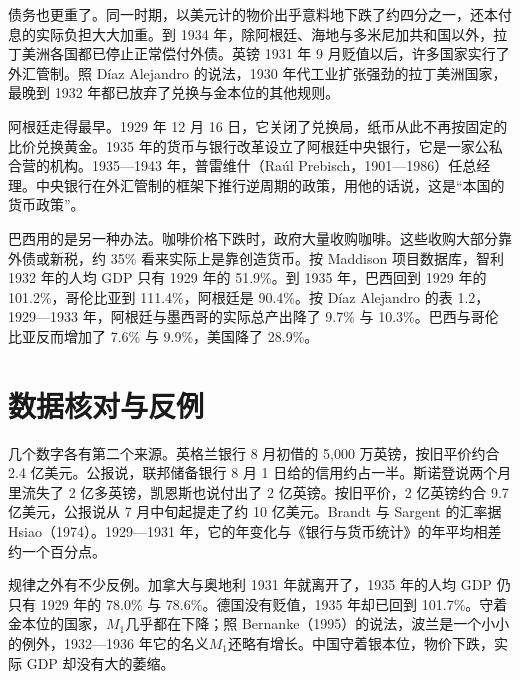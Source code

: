 债务也更重了。同一时期，以美元计的物价出乎意料地下跌了约四分之一，还本付息的实际负担大大加重\cite{diaz1983}。到 1934 年，除阿根廷、海地与多米尼加共和国以外，拉丁美洲各国都已停止正常偿付外债\cite{diaz1983}。英镑 1931 年 9 月贬值以后，许多国家实行了外汇管制\cite{diaz1983}。照 Díaz Alejandro 的说法，1930 年代工业扩张强劲的拉丁美洲国家，最晚到 1932 年都已放弃了兑换与金本位的其他规则\cite{diaz1983}。

阿根廷走得最早。1929 年 12 月 16 日，它关闭了兑换局，纸币从此不再按固定的比价兑换黄金\cite{frb1931}。1935 年的货币与银行改革设立了阿根廷中央银行，它是一家公私合营的机构\cite{bcra2025}。1935—1943 年，普雷维什（Raúl Prebisch，1901—1986）任总经理\cite{bcra2025,bnf29}。中央银行在外汇管制的框架下推行逆周期的政策，用他的话说，这是“本国的货币政策”\cite{bcra2025}。

巴西用的是另一种办法。咖啡价格下跌时，政府大量收购咖啡。这些收购大部分靠外债或新税，约 35\% 看来实际上是靠创造货币\cite{diaz1983}。按 Maddison 项目数据库，智利 1932 年的人均 GDP 只有 1929 年的 51.9\%\cite{mpd2023}。到 1935 年，巴西回到 1929 年的 101.2\%，哥伦比亚到 111.4\%，阿根廷是 90.4\%\cite{mpd2023}。按 Díaz Alejandro 的表 1.2，1929—1933 年，阿根廷与墨西哥的实际总产出降了 9.7\% 与 10.3\%\cite{diaz1983}。巴西与哥伦比亚反而增加了 7.6\% 与 9.9\%，美国降了 28.9\%\cite{diaz1983}。

\section{数据核对与反例}\label{sec:depressionworld-check}

几个数字各有第二个来源。英格兰银行 8 月初借的 5,000 万英镑，按旧平价约合 2.4 亿美元\cite{hansard1931}。公报说，联邦储备银行 8 月 1 日给的信用约占一半\cite{frb1931}。斯诺登说两个月里流失了 2 亿多英镑，凯恩斯也说付出了 2 亿英镑\cite{hansard1931,keynes1931}。按旧平价，2 亿英镑约合 9.7 亿美元，公报说从 7 月中旬起提走了约 10 亿美元\cite{frb1931}。Brandt 与 Sargent 的汇率据 Hsiao（1974）\cite{brandt1989}。1929—1931 年，它的年变化与《银行与货币统计》的年平均相差约一个百分点\cite{bms1943}。

规律之外有不少反例。加拿大与奥地利 1931 年就离开了，1935 年的人均 GDP 仍只有 1929 年的 78.0\% 与 78.6\%\cite{mpd2023}。德国没有贬值，1935 年却已回到 101.7\%\cite{mpd2023}。守着金本位的国家，$M_1$几乎都在下降；照 Bernanke（1995）的说法，波兰是一个小小的例外，1932—1936 年它的名义$M_1$还略有增长\cite{bernanke1995}。中国守着银本位，物价下跌，实际 GDP 却没有大的萎缩\cite{brandt1989}。

